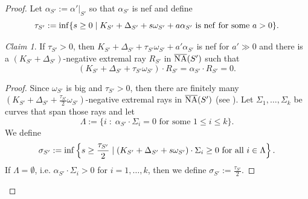 \documentclass[12pt]{amsart}
\theoremstyle{plain}
\theoremstyle{remark}
\theoremstyle{definition}
\newcommand{\<}{\leq}
\theoremstyle{definition}
\theoremstyle{definition}
\numberwithin{equation}{section}
\theoremstyle{remark}
\newtheorem{claim}[theorem]{Claim}
\begin{document}
\begin{proof}
Let $\alpha _{S'}:=\alpha' |_{S'}$ so that $\alpha _{S'}$ is nef and define
 \[\tau _{S'}:={\rm inf}\{s\geq 0\;|\; K_{S'}+\Delta _{S'}+s\omega _{S'}+a\alpha _{S'}\ {\rm is\ nef\ for\ some\ }a>0\}.\]
 \begin{claim}\label{c-S}
     If $\tau _{S'}>0$, then $K_{S'}+\Delta _{S'}+\tau _{S'}\omega _{S'}+a'\alpha _{S'}$ is nef for $a'\gg 0$ and there is a $(K_{S'}+\Delta _{S'})$-negative extremal ray $R_{S'}$ in $\overline{\rm NA}(S')$ such that
     \[(K_{S'}+\Delta _{S'}+\tau _{S'}\omega _{S'})\cdot R_{S'}=\alpha _{S'} \cdot R_{S'}=0.\]
 \end{claim}
 \begin{proof}
     Since $\omega _{S'}$ is big and $\tau _{S'}>0$, then there are finitely many $(K_{S'}+\Delta _{S'}+\frac {\tau _{S'}}2\omega _{S'})$-negative extremal rays in $\overline{\rm NA}(S')$ (see \cite[Corollary 2.32]{DHY23}). Let $\Sigma _1,\ldots , \Sigma _k$ be curves that span those rays 
     and let \[\Lambda:=\{i\;:\; \alpha_{S'}\cdot \Sigma_i=0 \mbox{ for some } 1\<i\<k\}.\] We define
     \[\sigma _{S'}:={\rm inf}\left\{s\geq \frac{\tau _{S'}}2\;|\;(K_{S'}+\Delta _{S'}+s\omega _{S'})\cdot \Sigma _i\geq 0\mbox{ for all } i\in\Lambda\right\}.\] 
    If $\Lambda=\emptyset$, i.e. $\alpha _{S'}\cdot \Sigma _i> 0$ for $i=1,\ldots, k$, then we define $\sigma _{S'}:=\frac{\tau _{S'}}2$.
     

\end{proof}
\end{proof}
\end{document}
